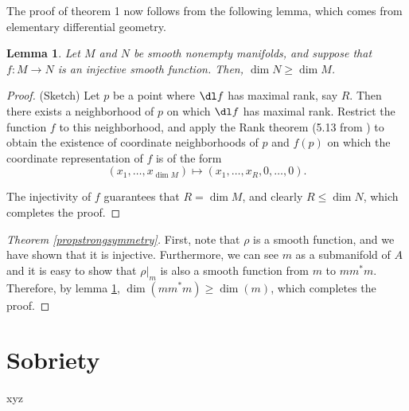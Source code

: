 \documentclass{article}
\theoremstyle{plain}
\newtheorem{lemma}{Lemma}
\theoremstyle{nonumberplain}
\newtheorem{proof}{Proof}
\begin{document}
The proof of theorem 1 now follows from the following lemma, which comes from elementary differential geometry.

\begin{lemma}\label{lemma1}
Let $M$ and $N$ be smooth nonempty manifolds, and suppose that $f \colon M \to N$ is an injective smooth function. Then, $\dim N \geq \dim M$.
\end{lemma}

\begin{proof} (Sketch)
Let $p$ be a point where $\dl f$ has maximal rank, say $R$. Then there exists a neighborhood of $p$ on which $\dl f$ has maximal rank. Restrict the function $f$ to this neighborhood, and apply the Rank theorem (5.13 from \cite{leesmooth}) to obtain the existence of coordinate neighborhoods of $p$ and $f(p)$ on which the coordinate representation of $f$ is of the form
\begin{equation}
(x_1, \dots, x_{\dim M}) \mapsto (x_1, \dots, x_R, 0, \dots, 0).
\end{equation}

The injectivity of $f$ guarantees that $R = \dim M$, and clearly $R \leq \dim N$, which completes the proof.
\end{proof}

\begin{proof}[Theorem \ref{propstrongsymmetry}]
First, note that $\rho$ is a smooth function, and we have shown that it is injective. Furthermore, we can see $m$ as a submanifold of $A$ and it is easy to show that $\rho|_m$ is also a smooth function from $m$ to $m m^* m$. Therefore, by lemma \ref{lemma1}, $\dim(m m^* m) \geq \dim(m)$, which completes the proof.
\end{proof}

\section{Sobriety}

xyz

\nocite{measurement}

{}

\end{document}
